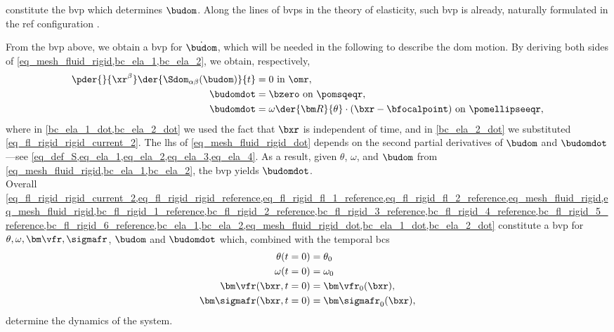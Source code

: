  constitute the \ac{bvp} which determines $\budom$. Along the lines of \acp{bvp} in the theory of elasticity, such \ac{bvp} is already, naturally formulated in the \ac{ref} configuration \cite{landauTheoryElasticity1986}.


From  the \ac{bvp} above, we obtain a \ac{bvp} for $\dot{\budom}$, which will be needed in the following to describe the \ac{dom} motion. By deriving both sides of \cref{eq_mesh_fluid_rigid,bc_ela_1,bc_ela_2}, we obtain, respectively,
\begin{align}
    \label{eq_mesh_fluid_rigid_dot}
    \pder{}{\xr^\beta}\der{\Sdom_{\alpha \beta}(\budom)}{t} & = 0 \text{ in } \omr,                                                                  \\
    \label{bc_ela_1_dot}
    \budomdot                                               & =\bzero \text{ on } \pomsqeqr,                                                         \\
    \label{bc_ela_2_dot}
    \budomdot                                               & =  \omega \der{{\bm R}}{\theta}\cdot (\bxr - \bfocalpoint) \text{ on } \pomellipseeqr,
\end{align}
where in \cref{bc_ela_1_dot,bc_ela_2_dot} we used the fact that $\bxr$ is independent of time, and in \cref{bc_ela_2_dot} we substituted \cref{eq_fl_rigid_rigid_current_2}. The \ac{lhs} of \cref{eq_mesh_fluid_rigid_dot} depends on the second partial derivatives of $\budom$ and $\budomdot$---see \cref{eq_def_S,eq_ela_1,eq_ela_2,eq_ela_3,eq_ela_4}. As a result, given $\theta$, $\omega$, and $\budom$ from \cref{eq_mesh_fluid_rigid,bc_ela_1,bc_ela_2}, the \ac{bvp}   yields $\budomdot$.\vspace{0.5cm}\\

Overall \cref{eq_fl_rigid_rigid_current_2,eq_fl_rigid_rigid_reference,eq_fl_rigid_fl_1_reference,eq_fl_rigid_fl_2_reference,eq_mesh_fluid_rigid,eq_mesh_fluid_rigid,bc_fl_rigid_1_reference,bc_fl_rigid_2_reference,bc_fl_rigid_3_reference,bc_fl_rigid_4_reference,bc_fl_rigid_5_reference,bc_fl_rigid_6_reference,bc_ela_1,bc_ela_2,eq_mesh_fluid_rigid_dot,bc_ela_1_dot,bc_ela_2_dot}
constitute a \ac{bvp} for $\theta, \omega, {\bm \vfr}, \sigmafr$, $\budom$ and $\budomdot$ which, combined with the temporal \acp{bc}
\begin{align}
    \theta(t=0)               & = \theta_0                \\
    \omega(t=0)               & = \omega_0                \\
    {\bm \vfr}(\bxr, t=0)     & = {\bm \vfr}_0(\bxr),     \\
    {\bm \sigmafr}(\bxr, t=0) & = {\bm \sigmafr}_0(\bxr),
\end{align}
determine the dynamics of the system.


